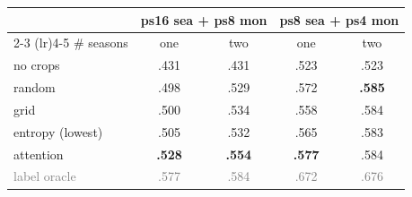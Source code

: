 \begin{table}[t]
\centering
\small
\begin{tabular}{lcccc}
\toprule
 & \multicolumn{2}{c}{ps16 sea + ps8 mon} & \multicolumn{2}{c}{ps8 sea + ps4 mon} \\
\cmidrule(lr){2-3} \cmidrule(lr){4-5}
\# seasons & one & two & one & two \\
\midrule
no crops & .431 & .431 & .523 & .523 \\
random & .498 & .529 & .572 & \textbf{.585} \\
grid & .500 & .534 & .558 & .584 \\
entropy (lowest) & .505 & .532 & .565 & .583 \\
attention & \textbf{.528} & \textbf{.554} & \textbf{.577} & .584 \\
\midrule
\textcolor{gray}{label oracle} & \textcolor{gray}{.577} & \textcolor{gray}{.584} & \textcolor{gray}{.672} & \textcolor{gray}{.676} \\
\bottomrule
\end{tabular}
\end{table}
